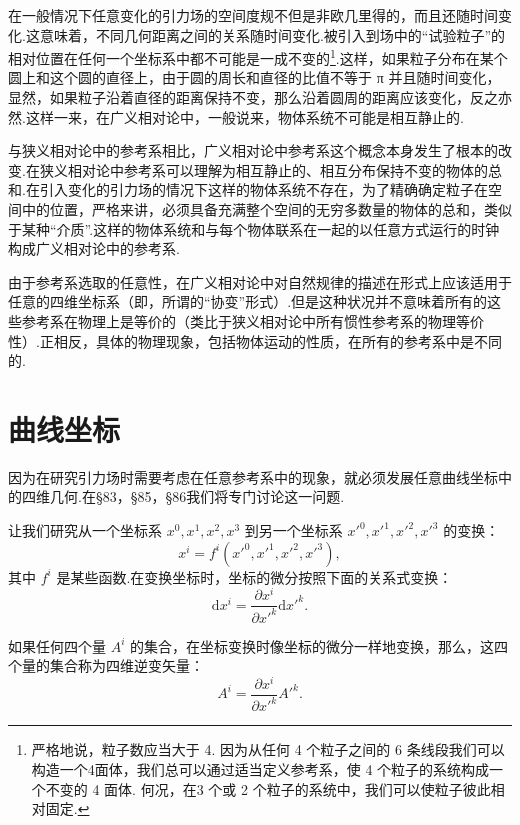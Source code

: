 在一般情况下任意变化的引力场的空间度规不但是非欧几里得的，而且还随时间变化.这意味着，不同几何距离之间的关系随时间变化.被引入到场中的“试验粒子”的相对位置在任何一个坐标系中都不可能是一成不变的\footnote{严格地说，粒子数应当大于 4. 因为从任何 4 个粒子之间的 6 条线段我们可以构造一个4面体，我们总可以通过适当定义参考系，使 4 个粒子的系统构成一个不变的 4 面体. 何况，在3 个或 2 个粒子的系统中，我们可以使粒子彼此相对固定.}.这样，如果粒子分布在某个圆上和这个圆的直径上，由于圆的周长和直径的比值不等于 π 并且随时间变化，显然，如果粒子沿着直径的距离保持不变，那么沿着圆周的距离应该变化，反之亦然.这样一来，在广义相对论中，一般说来，物体系统不可能是相互静止的.

与狭义相对论中的参考系相比，广义相对论中参考系这个概念本身发生了根本的改变.在狭义相对论中参考系可以理解为相互静止的、相互分布保持不变的物体的总和.在引入变化的引力场的情况下这样的物体系统不存在，为了精确确定粒子在空间中的位置，严格来讲，必须具备充满整个空间的无穷多数量的物体的总和，类似于某种“介质”.这样的物体系统和与每个物体联系在一起的以任意方式运行的时钟构成广义相对论中的参考系.

由于参考系选取的任意性，在广义相对论中对自然规律的描述在形式上应该适用于任意的四维坐标系（即，所谓的“协变”形式）.但是这种状况并不意味着所有的这些参考系在物理上是等价的（类比于狭义相对论中所有惯性参考系的物理等价性）.正相反，具体的物理现象，包括物体运动的性质，在所有的参考系中是不同的.

\section{曲线坐标}

因为在研究引力场时需要考虑在任意参考系中的现象，就必须发展任意曲线坐标中的四维几何.在§83，§85，§86我们将专门讨论这一问题.

让我们研究从一个坐标系 $x^0,x^1,x^2,x^3$ 到另一个坐标系 $x'^0,x'^1,x'^2,x'^3$ 的变换：
\begin{equation*}
  x^i=f^i(x'^0,x'^1,x'^2,x'^3),
\end{equation*}
其中 $f^i$ 是某些函数.在变换坐标时，坐标的微分按照下面的关系式变换：
\begin{equation}
  \mathrm{d}x^i=\frac{\partial x^i}{\partial x'^k}\mathrm{d}x'^k.
\end{equation}

如果任何四个量 $A^i$ 的集合，在坐标变换时像坐标的微分一样地变换，那么，这四个量的集合称为四维逆变矢量：
\begin{equation}
  A^i=\frac{\partial x^i}{\partial x'^k}A'^k.
\end{equation}

